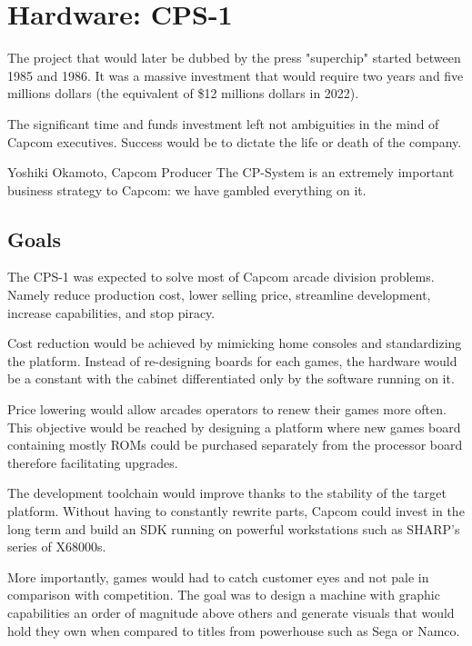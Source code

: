 \chapter{Hardware: CPS-1}

The project that would later be dubbed by the press "superchip"\cite{tgm198906} started between 1985 and 1986. It was a massive investment that would require two years and five millions dollars\cite{becareful} (the equivalent of \$12 millions dollars in 2022).

The significant time and funds investment left not ambiguities in the mind of Capcom executives. Success would be to dictate the life or death of the company.

\begin{q}{Yoshiki Okamoto, Capcom Producer\cite{gamest38}}
The CP-System is an extremely important business strategy to Capcom: we have gambled everything on it.
\end{q}

\section{Goals}
The CPS-1 was expected to solve most of Capcom arcade division problems. Namely reduce production cost, lower selling price, streamline development, increase capabilities, and stop piracy. 

Cost reduction would be achieved by mimicking home consoles and standardizing the platform. Instead of re-designing boards for each games, the hardware would be a constant with the cabinet differentiated only by the software running on it.

Price lowering would allow arcades operators to renew their games more often. This objective would be reached by designing a platform where new games board containing mostly ROMs could be purchased separately from the processor board therefore facilitating upgrades.

The development toolchain would improve thanks to the stability of the target platform. Without having to constantly rewrite parts, Capcom could invest in the long term and build an SDK running on powerful workstations such as SHARP's series of X68000s.

More importantly, games would had to catch customer eyes and not pale in comparison with competition. The goal was to design a machine with graphic capabilities an order of magnitude above others and generate visuals that would hold they own when compared to titles from powerhouse such as Sega or Namco.

